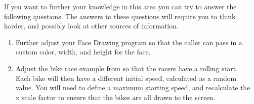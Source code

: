 \bigskip

If you want to further your knowledge in this area you can try to answer the following questions. The answers to these questions will require you to think harder, and possibly look at other sources of information.

\begin{enumerate}
  \item Further adjust your Face Drawing program so that the caller can pass in a custom color, width, and height for the face.
  \item Adjust the bike race example from  so that the racers have a rolling start. Each bike will then have a different initial speed, calculated as a random value. You will need to define a maximum starting speed, and recalculate the x scale factor to ensure that the bikes are all drawn to the screen.
\end{enumerate}

